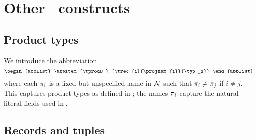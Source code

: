 \section{Other \MS\ constructs}
\label{other}







\subsection{Product types}

We introduce the abbreviation
\[
\begin{abblist}
\abbitem{\tprodO}
        {\trec{i}{\projnam{i}}{\typ_i}}
\end{abblist}
\]
where each $\pi_{i}$ is a fixed but unspecified name in $\mathcal{N}$ such that
$\pi_{i}\neq\pi_{j}$ if $i\neq j$. This captures product types as defined
in \cite{lm}; the names $\pi_{i}$ capture the natural literal fields used
in \cite{lm}.

\subsection{Records and tuples}

